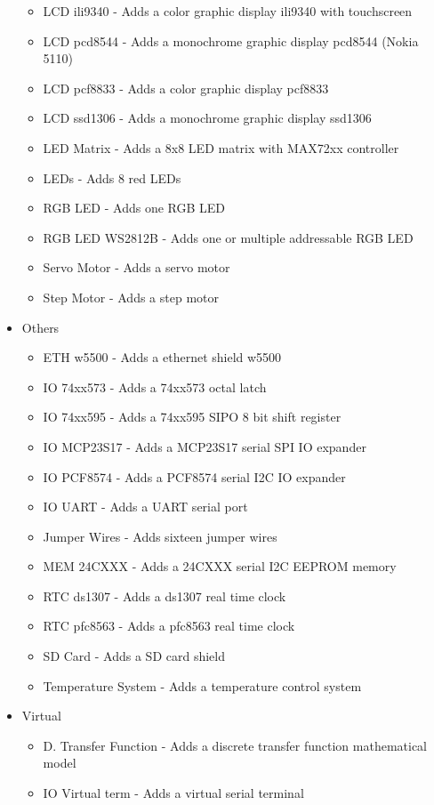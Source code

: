 \begin{itemize}
\begin{itemize}
   \item LCD ili9340 - Adds a color graphic display ili9340 with touchscreen 
   \item LCD pcd8544 - Adds a monochrome graphic display pcd8544 (Nokia 5110)
   \item LCD pcf8833 - Adds a color graphic display pcf8833
   \item LCD ssd1306 - Adds a monochrome graphic display ssd1306
   \item LED Matrix - Adds a 8x8 LED matrix with MAX72xx controller 
   \item LEDs - Adds 8 red LEDs
   \item RGB LED - Adds one RGB LED 
   \item RGB LED WS2812B - Adds one or multiple addressable RGB LED 
   \item Servo Motor - Adds a servo motor
   \item Step Motor - Adds a step motor
 \end{itemize}
 \item{Others}
  \begin{itemize}
   \item ETH w5500 - Adds a ethernet shield w5500
   \item IO 74xx573 - Adds a 74xx573 octal latch
   \item IO 74xx595 - Adds a 74xx595 SIPO 8 bit shift register
   \item IO MCP23S17 - Adds a MCP23S17 serial SPI IO expander
   \item IO PCF8574 - Adds a PCF8574 serial I2C IO expander
   \item IO UART - Adds a UART serial port 
   \item Jumper Wires - Adds sixteen jumper wires 
   \item MEM 24CXXX - Adds a 24CXXX serial I2C EEPROM  memory
   \item RTC ds1307 - Adds a ds1307 real time clock 
   \item RTC pfc8563 - Adds a pfc8563 real time clock
   \item SD Card - Adds a SD card shield
   \item Temperature System - Adds a temperature control system
  \end{itemize}
\item{Virtual}
  \begin{itemize}
  \item D. Transfer Function - Adds a discrete transfer function mathematical model
  \item IO Virtual term - Adds a virtual serial terminal 

\end{itemize}
\end{itemize}
